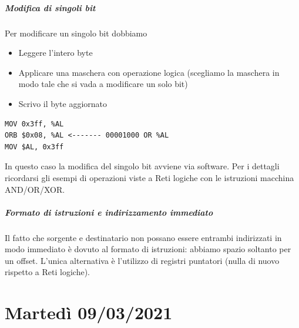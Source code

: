 \documentclass[11pt]{report}
\theoremstyle{definition}
\begin{document}
\paragraph{Modifica di singoli bit} Per modificare un singolo bit dobbiamo
\begin{itemize}
\item Leggere l'intero byte
\item Applicare una maschera con operazione logica (scegliamo la maschera in modo tale che si vada a modificare un solo bit)
\item Scrivo il byte aggiornato
\end{itemize}
\begin{verbatim}
MOV 0x3ff, %AL
ORB $0x08, %AL <------- 00001000 OR %AL
MOV $AL, 0x3ff
\end{verbatim}
In questo caso la modifica del singolo bit avviene via software. Per i dettagli ricordarsi gli esempi di operazioni viste a Reti logiche con le istruzioni macchina AND/OR/XOR.
\paragraph{Formato di istruzioni e indirizzamento immediato} Il fatto che sorgente e destinatario non possano essere entrambi indirizzati in modo immediato è dovuto al formato di istruzioni: abbiamo spazio soltanto per un offset. L'unica alternativa è l'utilizzo di registri puntatori (nulla di nuovo rispetto a Reti logiche).


\chapter{Martedì 09/03/2021}
\end{document}
